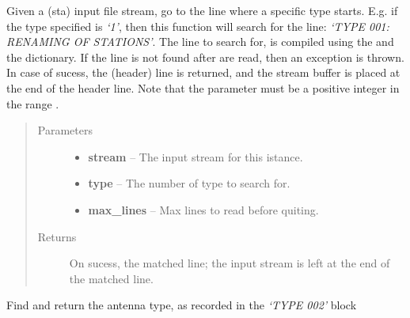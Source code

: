 \documentclass[letterpaper,10pt,english]{sphinxmanual}
\begin{document}
\begin{fulllineitems}
\begin{fulllineitems}
\label{bsta:bsta.stafile.findTypeStart}
Given a (sta) input file stream, go to the line where a specific
type starts. E.g. if the type specified is \emph{`1'}, then this function
will search for the line: \emph{`TYPE 001: RENAMING OF STATIONS'}.
The line to search for, is compiled using the  and the 
 dictionary. If the line is not found after 
 are read, then an exception is thrown.
In case of sucess, the (header) line is returned, and the stream
buffer is placed at the end of the header line.
Note that the  parameter must be a positive integer in the
range .
\begin{quote}\begin{description}
\item[{Parameters}] \leavevmode\begin{itemize}
\item {} 
\textbf{stream} -- The input stream for this istance.

\item {} 
\textbf{type} -- The number of type to search for.

\item {} 
\textbf{max\_lines} -- Max lines to read before quiting.

\end{itemize}

\item[{Returns}] \leavevmode
On sucess, the matched line; the input stream is 
left at the end of the matched line.

\end{description}\end{quote}

\end{fulllineitems}


\begin{fulllineitems}
\label{bsta:bsta.stafile.getStationAntenna}
Find and return the antenna type, as recorded in the \emph{`TYPE 002'}
block

\end{fulllineitems}



\end{fulllineitems}
\end{document}
